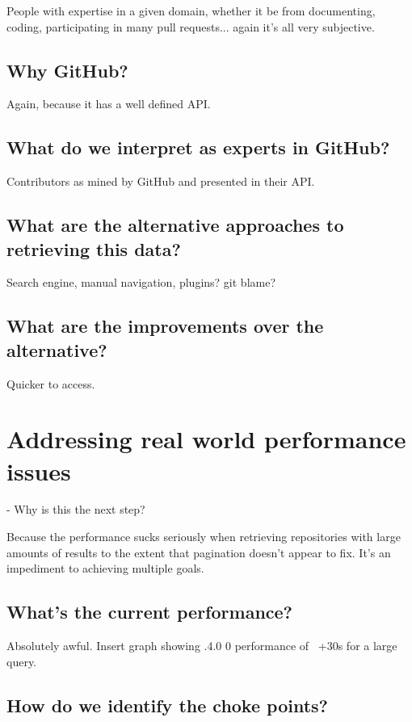 People with expertise in a given domain, whether it be from documenting, coding, participating in many pull requests... again it's all very subjective.

\subsection{Why GitHub?}

Again, because it has a well defined API.

\subsection{What do we interpret as experts in GitHub?}

Contributors as mined by GitHub and presented in their API.

\subsection{What are the alternative approaches to retrieving this data?}

Search engine, manual navigation, plugins? git blame?

\subsection{What are the improvements over the alternative?}

Quicker to access.

\section{Addressing real world performance issues}

- Why is this the next step?

Because the performance sucks seriously when retrieving repositories with large amounts of results to the extent that pagination doesn't appear to fix. It's an impediment to achieving multiple goals.

\subsection{What's the current performance?}

Absolutely awful. Insert graph showing .4.0 0 performance of ~+30s for a large query.

\subsection{How do we identify the choke points?}

